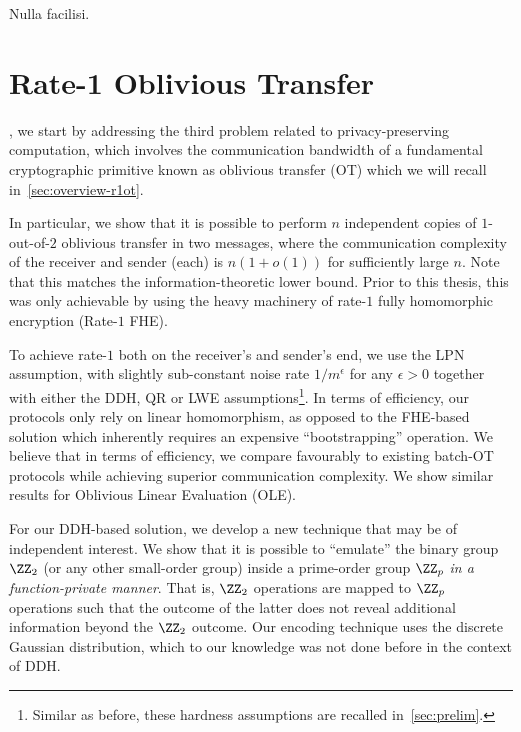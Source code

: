 \begin{savequote}[75mm]
Nulla facilisi. 
\end{savequote}

\chapter{Rate-1 Oblivious Transfer}
\label{sec:r1ot}
, we start by addressing the third problem related to privacy-preserving computation, which involves the communication bandwidth of a fundamental cryptographic primitive known as oblivious transfer (OT) which we will recall in~\cref{sec:overview-r1ot}.

In particular, we show that it is possible
to perform $n$ independent copies of $1$-out-of-$2$ oblivious transfer in two messages, where the communication complexity of the receiver and sender (each) is $n(1+o(1))$ for sufficiently large $n$. Note that this matches the information-theoretic lower bound. Prior to this thesis, this was only achievable by using the heavy machinery of rate-$1$ fully homomorphic encryption (Rate-$1$ FHE\cite{TCC:BDGM19}). 

To achieve rate-$1$ both on the receiver's and sender's end, we use the LPN assumption, with slightly sub-constant noise rate $1/m^{\epsilon}$ for any $\epsilon>0$ together with either the DDH, QR or LWE assumptions\footnote{Similar as before, these hardness assumptions are recalled in~\cref{sec:prelim}.}. In terms of efficiency, our protocols only rely on linear homomorphism, as opposed to the FHE-based solution which inherently requires an expensive ``bootstrapping'' operation. We believe that in terms of efficiency, we compare favourably to existing batch-OT protocols while achieving superior communication complexity. We show similar results for Oblivious Linear Evaluation (OLE).

For our DDH-based solution, we develop a new technique that may be of independent interest. We show that it is possible to ``emulate'' the binary group $\ZZ_2$ (or any other small-order group) inside a prime-order group $\ZZ_p$ \emph{in a function-private manner}. That is, $\ZZ_2$ operations are mapped to $\ZZ_p$ operations such that the outcome of the latter does not reveal additional information beyond the $\ZZ_2$ outcome. Our encoding technique uses the discrete Gaussian distribution, which to our knowledge was not done before in the context of DDH.


